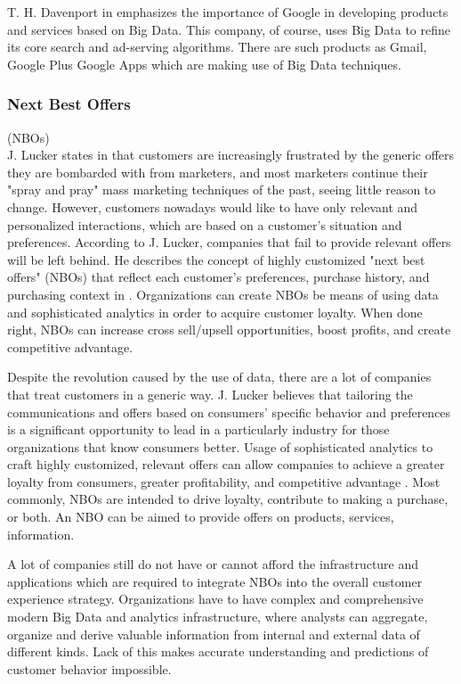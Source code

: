 \documentclass[runningheads]{llncs}
\begin{document}
\begin{enumerate}
T. H. Davenport in \cite{DAVENPORT} emphasizes the importance of Google in developing products and services based on Big Data. This company, of course, uses Big Data to refine its core search and ad-serving algorithms. There are such products as Gmail, Google Plus Google Apps which are making use of Big Data techniques. 

\subsubsection{Next Best Offers} (NBOs)\\

J. Lucker states in \cite{HBR} that customers are increasingly frustrated by the generic offers they are bombarded with from marketers, and most marketers continue their "spray and pray" mass marketing techniques of the past, seeing little reason to change. However, customers nowadays would like to have only relevant and personalized interactions, which are based on a customer's situation and preferences. According to J. Lucker, companies that fail to provide relevant offers will be left behind. He describes the concept of highly customized "next best offers" (NBOs) that reflect each customer's preferences, purchase history, and purchasing context in \cite{HBR}. Organizations can create NBOs be means of using data and sophisticated analytics in order to acquire customer loyalty. When done right, NBOs can increase cross sell/upsell opportunities, boost profits, and create competitive advantage.

Despite the revolution caused by the use of data, there are a lot of companies that treat customers in a generic way. J. Lucker believes that tailoring the communications and offers based on consumers' specific behavior and preferences is a significant opportunity to lead in a particularly industry for those organizations that know consumers better. Usage of sophisticated analytics to craft highly customized, relevant offers can allow companies to achieve a greater loyalty from consumers, greater profitability, and competitive advantage \cite{HBR}. Most commonly, NBOs are intended to drive loyalty, contribute to making a purchase, or both. An NBO can be aimed to provide offers on products, services, information.

A lot of companies still do not have or cannot afford the infrastructure and applications which are required to integrate NBOs into the overall customer experience strategy. Organizations have to have complex and comprehensive modern Big Data and analytics infrastructure, where analysts can aggregate, organize and derive valuable information from internal and external data of different kinds. Lack of this makes accurate understanding and predictions of customer behavior impossible.


\end{enumerate}
\end{document}
